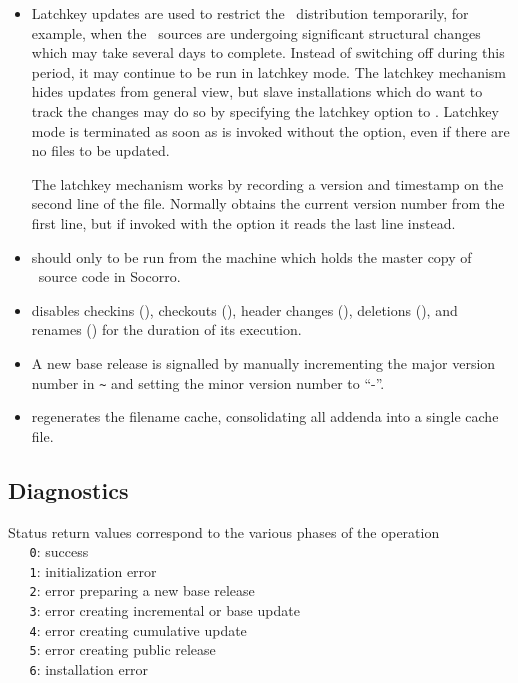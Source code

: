 \begin{itemize}
\item
   Latchkey updates are used to restrict the \aipspp\ distribution
   temporarily, for example, when the \aipspp\ sources are undergoing
   significant structural changes which may take several days to complete.
   Instead of switching  off during this period, it may continue
   to be run in latchkey mode.  The latchkey mechanism hides updates from
   general view, but slave installations which do want to track the changes
   may do so by specifying the  latchkey option to .
   Latchkey mode is terminated as soon as  is invoked without the
    option, even if there are no files to be updated.

   The latchkey mechanism works by recording a version and timestamp on the
   second line of the  file.  Normally  obtains
   the current version number from the first line, but if invoked with the
    option it reads the last line instead.

\item
    should only to be run from the machine which holds the master
   copy of \aipspp\ source code in Socorro.

\item
    disables checkins (), checkouts (),
   header changes (), deletions (), and renames
   () for the duration of its execution.

\item
   A new base release is signalled by manually incrementing the major version
   number in \verb+~+ and setting the minor
   version number to ``-''.

\item
    regenerates the  filename cache, consolidating all
   addenda into a single cache file.
\end{itemize}

\subsection*{Diagnostics}

Status return values correspond to the various phases of the operation
\\ \verb+   0+: success
\\ \verb+   1+: initialization error
\\ \verb+   2+: error preparing a new base release
\\ \verb+   3+: error creating incremental or base update
\\ \verb+   4+: error creating cumulative update
\\ \verb+   5+: error creating public release
\\ \verb+   6+: installation error

